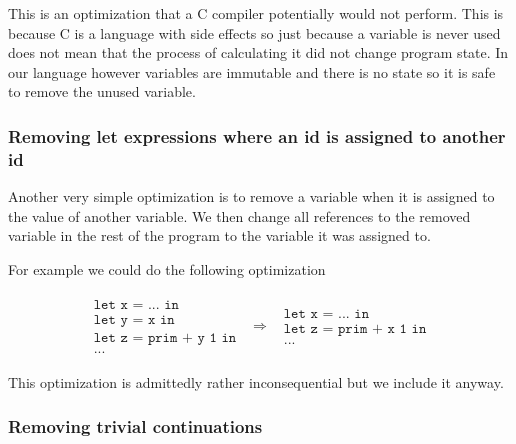 \documentclass[a4paper]{article}
\newcommand{\optimization}[2]{
	\[
		\begin{array}{rcl}
			#1 & \Rightarrow & #2
		\end{array}
	\]
}
\begin{document}
This is an optimization that a C compiler potentially would not perform. This is because C is a language with side effects so just because a variable is never used does not mean that the process of calculating it did not change program state. In our language however variables are immutable and there is no state so it is safe to remove the unused variable.




\subsubsection{Removing let expressions where an id is assigned to another id}

Another very simple optimization is to remove a variable when it is assigned to the value of another variable. We then change all references to the removed variable in the rest of the program to the variable it was assigned to.

For example we could do the following optimization
\optimization{
	\begin{array}{l}
		\texttt{let x = ... in} \\
		\texttt{let y = x in} \\
		\texttt{let z = prim + y 1 in}\\
		\texttt{...}
	\end{array}
}{
	\begin{array}{l}
		\texttt{let x = ... in} \\
		\texttt{let z = prim + x 1 in}\\
		\texttt{...}
	\end{array}
}
This optimization is admittedly rather inconsequential but we include it anyway.




\subsubsection{Removing trivial continuations}
\end{document}
